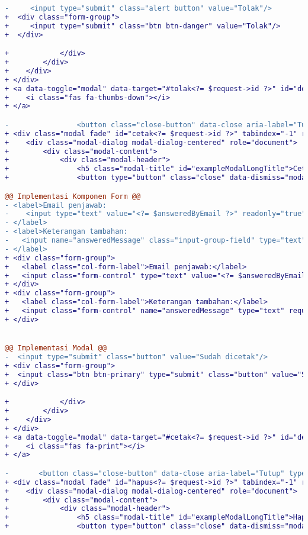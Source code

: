 \begin{lstlisting}[language=diff, caption=Kode untuk Modal Cetak Transkrip Manage, label=Entri, basicstyle=\ttfamily, frame=single,
columns=fullflexible, keepspaces=true, breaklines=true]
-     <input type="submit" class="alert button" value="Tolak"/>
+  <div class="form-group">
+     <input type="submit" class="btn btn-danger" value="Tolak"/>
+  </div>

+            </div>
+        </div>
+    </div>
+ </div>
+ <a data-toggle="modal" data-target="#tolak<?= $request->id ?>" id="detailIkon<?= $request->id ?>">
+    <i class="fas fa-thumbs-down"></i>
+ </a>

-                <button class="close-button" data-close aria-label="Tutup" type="button">
+ <div class="modal fade" id="cetak<?= $request->id ?>" tabindex="-1" role="dialog" aria-hidden="true">
+    <div class="modal-dialog modal-dialog-centered" role="document">
+        <div class="modal-content">
+            <div class="modal-header">
+                <h5 class="modal-title" id="exampleModalLongTitle">Cetak Permohonan #<?= $request->id ?></h5>
+                <button type="button" class="close" data-dismiss="modal" aria-label="Close">

@@ Implementasi Komponen Form @@
- <label>Email penjawab:
-	 <input type="text" value="<?= $answeredByEmail ?>" readonly="true"/>
- </label>
- <label>Keterangan tambahan:
-   <input name="answeredMessage" class="input-group-field" type="text" required/>
- </label>
+ <div class="form-group">
+   <label class="col-form-label">Email penjawab:</label>
+   <input class="form-control" type="text" value="<?= $answeredByEmail ?>" readonly="true"/>
+ </div>
+ <div class="form-group">
+   <label class="col-form-label">Keterangan tambahan:</label>
+   <input class="form-control" name="answeredMessage" type="text" required/>
+ </div>


@@ Implementasi Modal @@                                            
-  <input type="submit" class="button" value="Sudah dicetak"/>
+ <div class="form-group">
+  <input class="btn btn-primary" type="submit" class="button" value="Sudah dicetak"/>
+ </div>

+            </div>
+        </div>
+    </div>
+ </div>
+ <a data-toggle="modal" data-target="#cetak<?= $request->id ?>" id="detailIkon<?= $request->id ?>">
+    <i class="fas fa-print"></i>
+ </a>

- 		<button class="close-button" data-close aria-label="Tutup" type="button">
+ <div class="modal fade" id="hapus<?= $request->id ?>" tabindex="-1" role="dialog" aria-hidden="true">
+    <div class="modal-dialog modal-dialog-centered" role="document">
+        <div class="modal-content">
+            <div class="modal-header">
+                <h5 class="modal-title" id="exampleModalLongTitle">Hapus Permohonan #<?= $request->id ?></h5>
+                <button type="button" class="close" data-dismiss="modal" aria-label="Close">


\end{lstlisting}
